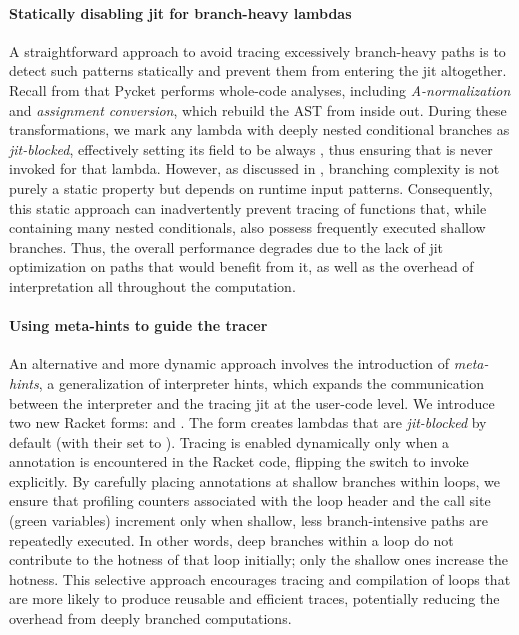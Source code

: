     \paragraph{Statically disabling \gls{jit} for branch-heavy lambdas}%
      A straightforward approach to avoid tracing excessively branch-heavy paths is to detect such patterns statically and prevent them from entering the \gls{jit} altogether. Recall from  that Pycket performs whole-code analyses, including \emph{A-normalization} and \emph{assignment conversion}, which rebuild the AST from inside out. During these transformations, we mark any lambda with deeply nested conditional branches as \emph{jit-blocked}, effectively setting its  field to be always , thus ensuring that  is never invoked for that lambda. However, as discussed in , branching complexity is not purely a static property but depends on runtime input patterns. Consequently, this static approach can inadvertently prevent tracing of functions that, while containing many nested conditionals, also possess frequently executed shallow branches. Thus, the overall performance degrades due to the lack of \gls{jit} optimization on paths that would benefit from it, as well as the overhead of interpretation all throughout the computation.

    \paragraph{Using meta-hints to guide the tracer}%
      An alternative and more dynamic approach involves the introduction of \emph{meta-hints}, a generalization of interpreter hints, which expands the communication between the interpreter and the tracing \gls{jit} at the user-code level. We introduce two new Racket forms:  and . The form  creates lambdas that are \emph{jit-blocked} by default (with their  set to ). Tracing is enabled dynamically only when a  annotation is encountered in the Racket code, flipping the switch to invoke  explicitly. By carefully placing  annotations at shallow branches within loops, we ensure that profiling counters associated with the loop header and the call site (green variables) increment only when shallow, less branch-intensive paths are repeatedly executed. In other words, deep branches within a loop do not contribute to the hotness of that loop initially; only the shallow ones increase the hotness. This selective approach encourages tracing and compilation of loops that are more likely to produce reusable and efficient traces, potentially reducing the overhead from deeply branched computations.

